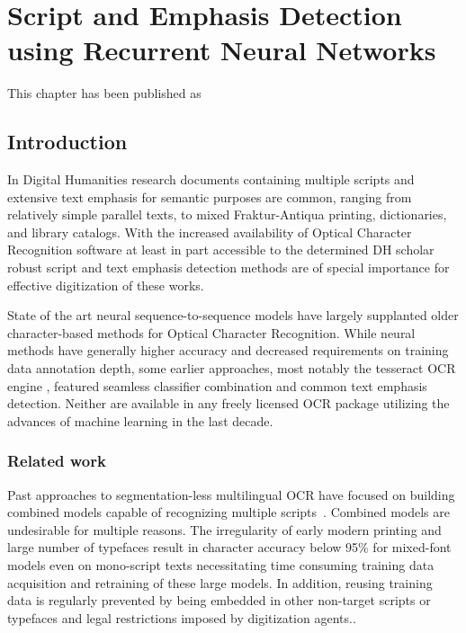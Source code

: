 \chapter{Script and Emphasis Detection using Recurrent Neural Networks}
\label{ch:multi}
\thispagestyle{empty}
\vfill
This chapter has been published as 
\newpage
\section{Introduction}

In Digital Humanities research documents containing multiple scripts and
extensive text emphasis for semantic purposes are common, ranging from
relatively simple parallel texts, to mixed Fraktur-Antiqua printing,
dictionaries, and library catalogs. With the increased availability of Optical
Character Recognition software at least in part accessible to the determined DH
scholar robust script and text emphasis detection methods are of special
importance for effective digitization of these works.

State of the art neural sequence-to-sequence models have largely supplanted
older character-based methods for Optical Character Recognition. While neural
methods have generally higher accuracy and decreased requirements on training
data annotation depth, some earlier approaches, most notably the tesseract OCR
engine \cite{smith2009adapting}, featured seamless classifier combination and
common text emphasis detection. Neither are available in any freely licensed
OCR package utilizing the advances of machine learning in the last decade.

\subsection{Related work}

Past approaches to segmentation-less multilingual OCR have focused on building
combined models capable of recognizing multiple scripts~\cite{ul2013can}.
Combined models are undesirable for multiple reasons. The irregularity of early
modern printing and large number of typefaces result in character accuracy
below 95\% for mixed-font models even on mono-script texts
\cite{springmann2016automatic} necessitating time consuming training data
acquisition and retraining of these large models. In addition, reusing training
data is regularly prevented by being embedded in other non-target scripts or
typefaces and legal restrictions imposed by digitization agents..

